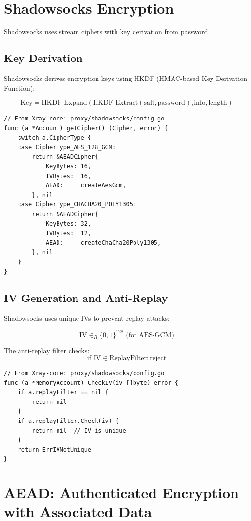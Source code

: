 \section{Shadowsocks Encryption}

Shadowsocks uses stream ciphers with key derivation from password.

\subsection{Key Derivation}

Shadowsocks derives encryption keys using HKDF (HMAC-based Key Derivation Function):

\[
\text{Key} = \text{HKDF-Expand}(\text{HKDF-Extract}(\text{salt}, \text{password}), \text{info}, \text{length})
\]

\begin{verbatim}
// From Xray-core: proxy/shadowsocks/config.go
func (a *Account) getCipher() (Cipher, error) {
    switch a.CipherType {
    case CipherType_AES_128_GCM:
        return &AEADCipher{
            KeyBytes: 16,
            IVBytes:  16,
            AEAD:     createAesGcm,
        }, nil
    case CipherType_CHACHA20_POLY1305:
        return &AEADCipher{
            KeyBytes: 32,
            IVBytes:  12,
            AEAD:     createChaCha20Poly1305,
        }, nil
    }
}
\end{verbatim}

\subsection{IV Generation and Anti-Replay}

Shadowsocks uses unique IVs to prevent replay attacks:

\[
\text{IV} \in_R \{0,1\}^{128} \text{ (for AES-GCM)}
\]

The anti-replay filter checks:
\[
\text{if } \text{IV} \in \text{ReplayFilter}: \text{reject}
\]

\begin{verbatim}
// From Xray-core: proxy/shadowsocks/config.go
func (a *MemoryAccount) CheckIV(iv []byte) error {
    if a.replayFilter == nil {
        return nil
    }
    if a.replayFilter.Check(iv) {
        return nil  // IV is unique
    }
    return ErrIVNotUnique
}
\end{verbatim}

\section{AEAD: Authenticated Encryption with Associated Data}

